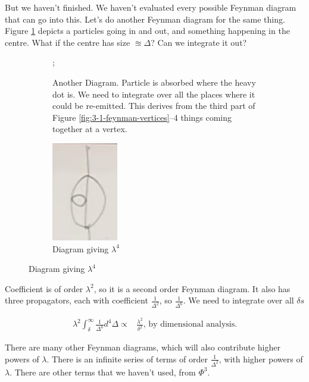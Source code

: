 \documentclass[]{article}
\begin{document}
But we haven't finished. We haven't evaluated every possible Feynman diagram that can go into this. Let's do another Feynman diagram for the same thing. Figure \ref{fig:particles3-another-Feynman} depicts a particles going in and out, and something happening in the centre. What if the centre has size $\approxeq \Delta$? Can we integrate it out?

\begin{figure}[H]
	\begin{center}
		\caption{More diagrams from Figure \ref{fig:mimicking:vertex}}
		\begin{subfigure}[t]{0.45\textwidth}
			\caption{Another Diagram. Particle is absorbed where the heavy dot is. We need to integrate over all the places where it could be re-emitted. This derives from the third part of Figure \ref{fig:3-1-feynman-vertices}--4 things coming together at a vertex.}\label{fig:particles3-another-Feynman}
			;
		\end{subfigure}
		\hfill
		\begin{subfigure}[t]{0.45\textwidth}
			\caption{Diagram giving $\lambda^4$}\label{fig:particles3-yet-another-Feynman}
			\includegraphics{particles3-yet-another-Feynman}
		\end{subfigure}
	\end{center}
\end{figure}

Coefficient is of order $\lambda^2$, so it is a second order Feynman diagram. It also has three propagators, each with coefficient $\frac{1}{\Delta^2}$, so $\frac{1}{\Delta^6}$. We need to integrate over all $\delta s$ 

\begin{align*}
	\lambda^2 \int_{\delta}^\infty \frac{1}{\Delta^6} d^4 \Delta \propto& \frac{\lambda^2}{\delta^2} \text{, by dimensional analysis.}
\end{align*}

There are many other Feynman diagrams, which will also contribute higher powers of $\lambda$. There is an infinite series of terms of order $\frac{1}{\Delta^2}$, with higher powers of $\lambda$. There are other terms that we haven't used, from $\Phi^3$.
\end{document}
